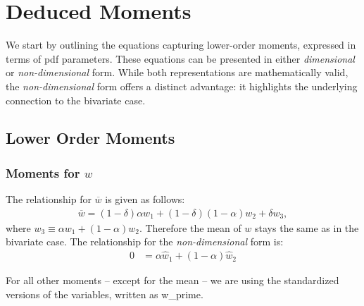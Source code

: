 \section{Deduced Moments}\label{sec:dedmoments}

We start by outlining the equations capturing lower-order moments,
expressed in terms of \gls{pdf} parameters.
These equations can be presented in either \emph{dimensional} or \emph{non-dimensional} form.
While both representations are mathematically valid,
the \emph{non-dimensional} form offers a distinct advantage:
it highlights the underlying connection to the bivariate case.

\subsection{Lower Order Moments}\label{subsec:lowerordermoments}

\subsubsection{Moments for $w$}\label{subsubsec:lowerordermoments_w}

The relationship for $\overline{w}$ is given as follows:
\begin{align}
    \label{eq:w_bar}
    \overline{w} = (1 - \delta) \alpha w_1 + (1 - \delta)(1-\alpha) w_2 + \delta w_3,
\end{align}
where $w_3 \equiv \alpha w_1 + (1 - \alpha) w_2$.
Therefore the mean of $w$ stays the same as in the bivariate case.
The relationship for the \emph{non-dimensional} form is:
\begin{align}
    \label{eq:w_bar_nondim}
    0 &= \alpha \widehat{w}_1 + (1 - \alpha) \widehat{w}_2
\end{align}

For all other moments -- except for the mean --
we are using the standardized versions of the variables, written as \gls{w_prime}.

